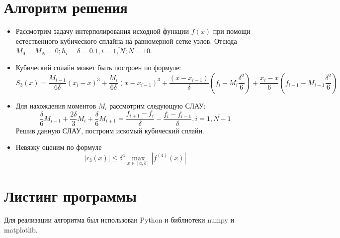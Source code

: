 \documentclass[14pt, a4paper]{article}
\begin{document}
  \section{Алгоритм решения}
  \begin{itemize}
     \item
     Рассмотрим задачу интерполирования исходной функции $f(x)$ при помощи естественного кубического сплайна на равномерной сетке узлов. Отсюда $M_0 = M_N = 0; h_i = \delta = 0.1, i = \overline{1, N}; N = 10$.
     \item 
     Кубический сплайн может быть построен по формуле: \begin{equation}S_3(x) = \frac{M_{i-1}}{6\delta}(x_i - x)^3 + \frac{M_i}{6\delta}(x - x_{i - 1})^3 + \frac{(x - x_{i - 1})}{\delta}\left(f_i - M_i\frac{\delta^2}{6}\right) + \frac{x_i - x}{6}\left(f_{i - 1} - M_{i - 1}\frac{\delta^2}{6}\right)\end{equation}
     \item
     Для нахождения моментов $M_i$ рассмотрим следующую СЛАУ: \begin{equation}\frac{\delta}{6}M_{i - 1} + \frac{2\delta}{3}M_i + \frac{\delta}{6}M_{i + 1} = \frac{f_{i + 1} - f_i}{\delta} - \frac{f_i - f_{i - 1}}{\delta}, i = \overline{1, N - 1}\end{equation}
     Решив данную СЛАУ, построим искомый кубический сплайн.
     \item
     Невязку оценим по формуле \begin{equation}|r_3(x)| \leq \delta^4\max\limits_{x \in [a, b]} |f^{(4)}(x)|\end{equation}
  \end{itemize}
  \section{Листинг программы}
  Для реализации алгоритма был использован Python и библиотеки numpy и matplotlib.
\end{document}
